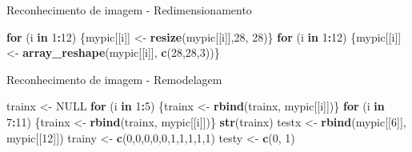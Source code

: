 \documentclass[
  ignorenonframetext,
]{beamer}
\newenvironment{Shaded}{\begin{snugshade}}{\end{snugshade}}
\newcommand{\ControlFlowTok}[1]{\textcolor[rgb]{0.13,0.29,0.53}{\textbf{#1}}}
\newcommand{\DecValTok}[1]{\textcolor[rgb]{0.00,0.00,0.81}{#1}}
\newcommand{\KeywordTok}[1]{\textcolor[rgb]{0.13,0.29,0.53}{\textbf{#1}}}
\newcommand{\NormalTok}[1]{#1}
\newcommand{\OperatorTok}[1]{\textcolor[rgb]{0.81,0.36,0.00}{\textbf{#1}}}
\newcommand{\OtherTok}[1]{\textcolor[rgb]{0.56,0.35,0.01}{#1}}
\newcommand{\StringTok}[1]{\textcolor[rgb]{0.31,0.60,0.02}{#1}}
\begin{document}
\begin{frame}[fragile]{Reconhecimento de imagem - Redimensionamento}
\protect\hypertarget{reconhecimento-de-imagem---redimensionamento}{}

\begin{Shaded}
\begin{Highlighting}[]
\ControlFlowTok{for}\NormalTok{ (i }\ControlFlowTok{in} \DecValTok{1}\OperatorTok{:}\DecValTok{12}\NormalTok{) \{mypic[[i]] <-}\StringTok{ }\KeywordTok{resize}\NormalTok{(mypic[[i]],}\DecValTok{28}\NormalTok{, }\DecValTok{28}\NormalTok{)\}}
\ControlFlowTok{for}\NormalTok{ (i }\ControlFlowTok{in} \DecValTok{1}\OperatorTok{:}\DecValTok{12}\NormalTok{) \{mypic[[i]] <-}\StringTok{ }\KeywordTok{array_reshape}\NormalTok{(mypic[[i]],}
                                             \KeywordTok{c}\NormalTok{(}\DecValTok{28}\NormalTok{,}\DecValTok{28}\NormalTok{,}\DecValTok{3}\NormalTok{))\}}
\end{Highlighting}
\end{Shaded}

\end{frame}

\begin{frame}[fragile]{Reconhecimento de imagem - Remodelagem}
\protect\hypertarget{reconhecimento-de-imagem---remodelagem}{}

\begin{Shaded}
\begin{Highlighting}[]
\NormalTok{trainx <-}\StringTok{ }\OtherTok{NULL}
\ControlFlowTok{for}\NormalTok{ (i }\ControlFlowTok{in} \DecValTok{1}\OperatorTok{:}\DecValTok{5}\NormalTok{) \{trainx <-}\StringTok{ }\KeywordTok{rbind}\NormalTok{(trainx, mypic[[i]])\}}
\ControlFlowTok{for}\NormalTok{ (i }\ControlFlowTok{in} \DecValTok{7}\OperatorTok{:}\DecValTok{11}\NormalTok{) \{trainx <-}\StringTok{ }\KeywordTok{rbind}\NormalTok{(trainx, mypic[[i]])\}}
\KeywordTok{str}\NormalTok{(trainx)}
\NormalTok{testx <-}\StringTok{ }\KeywordTok{rbind}\NormalTok{(mypic[[}\DecValTok{6}\NormalTok{]], mypic[[}\DecValTok{12}\NormalTok{]])}
\NormalTok{trainy <-}\StringTok{ }\KeywordTok{c}\NormalTok{(}\DecValTok{0}\NormalTok{,}\DecValTok{0}\NormalTok{,}\DecValTok{0}\NormalTok{,}\DecValTok{0}\NormalTok{,}\DecValTok{0}\NormalTok{,}\DecValTok{1}\NormalTok{,}\DecValTok{1}\NormalTok{,}\DecValTok{1}\NormalTok{,}\DecValTok{1}\NormalTok{,}\DecValTok{1}\NormalTok{)}
\NormalTok{testy <-}\StringTok{ }\KeywordTok{c}\NormalTok{(}\DecValTok{0}\NormalTok{, }\DecValTok{1}\NormalTok{)}
\end{Highlighting}
\end{Shaded}

\end{frame}
\end{document}
